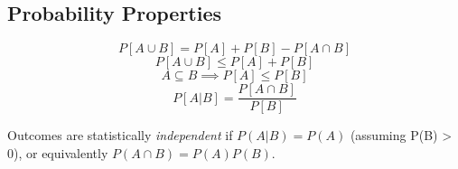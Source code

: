 \subsection{Probability Properties}
\begin{equation}
    P\left[A \cup B\right] = P\left[A\right] + P\left[B\right] - P\left[A \cap B\right]
\end{equation}
\begin{equation}
    P\left[A \cup B\right] \leq P\left[A\right] + P\left[B\right]
\end{equation}
\begin{equation}
    A \subseteq B \implies P\left[A\right] \leq P\left[B\right]
\end{equation}
\begin{equation}
    P\left[A | B\right] = \frac{P[A \cap B]}{P[B]}
\end{equation}

Outcomes are statistically \emph{independent} if
$P(A|B) = P(A)$ (assuming P(B) > 0), or
equivalently $P(A \cap B) = P(A)P(B)$.